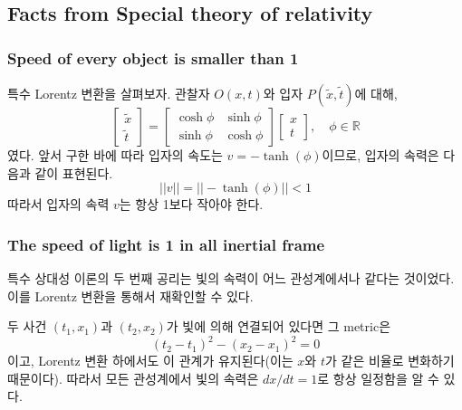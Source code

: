 \documentclass[10pt,a4paper]{article}
\begin{document}
\subsection{Facts from Special theory of relativity}
\subsubsection{Speed of every object is smaller than 1}
특수 Lorentz 변환을 살펴보자. 관찰자 $O(x, t)$와 입자 $P(\tilde{x}, \tilde{t})$에 대해,
\[
    \begin{bmatrix}
        \tilde{x}\\\tilde{t}
    \end{bmatrix} = 
    \begin{bmatrix}
        \cosh{\phi} & \sinh{\phi}\\
        \sinh{\phi} & \cosh{\phi}
    \end{bmatrix}
    \begin{bmatrix}
        x \\ t
    \end{bmatrix}, \quad \phi \in \mathbb{R}
\]
였다. 앞서 구한 바에 따라 입자의 속도는 $v = -\tanh(\phi)$이므로, 입자의 속력은 다음과 같이 표현된다.
\begin{equation*}
|\!|v|\!| = |\!|-\tanh(\phi)|\!|<1
\end{equation*}
따라서 입자의 속력 $v$는 항상 1보다 작아야 한다.

\subsubsection{The speed of light is 1 in all inertial frame}
특수 상대성 이론의 두 번째 공리는 빛의 속력이 어느 관성계에서나 같다는 것이었다. 이를 Lorentz 변환을 통해서 재확인할 수 있다.

두 사건 $(t_1, x_1)$과 $(t_2, x_2)$가 빛에 의해 연결되어 있다면 그 metric은
\begin{equation*}
(t_2 - t_1)^2 - (x_2 - x_1)^2 = 0
\end{equation*}
이고, Lorentz 변환 하에서도 이 관계가 유지된다(이는 $x$와 $t$가 같은 비율로 변화하기 때문이다). 따라서 모든 관성계에서 빛의 속력은 $dx/dt = 1$로 항상 일정함을 알 수 있다.
\end{document}

